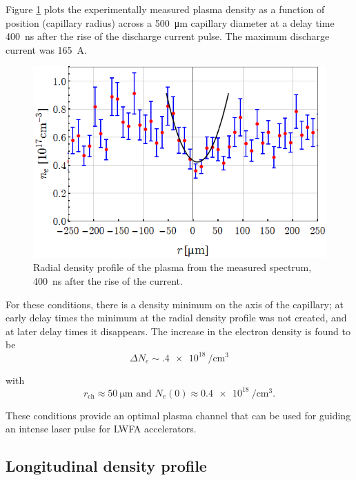 \documentclass[../main.tex]{subfiles}
\begin{document}
Figure \ref{fig:plasma_channel_spectro} plots the experimentally measured plasma density as a function of position (capillary radius) across a \SI{500}{\um} capillary diameter at a delay time \SI{400}{\ns} after the rise of the discharge current pulse. The maximum discharge current was \SI{165}{\A}.

\begin{figure}
\centering
\includegraphics[width=\textwidth]{figures/spectro/parabolic.png}
\caption{Radial density profile of the plasma from the measured spectrum, \SI{400}{\ns} after the rise of the current.}
\label{fig:plasma_channel_spectro}
\end{figure}

For these conditions, there is a density minimum on the axis of the capillary; at early delay times the minimum at the radial density profile was not created, and at later delay times it disappears. The increase in the electron density is found to be 
\begin{equation}
    \Delta N_e \sim \SI{.4e18}{\per\cubic\cm}
\end{equation}

with
\begin{equation}
r_\text{ch}\approx \SI{50}{\um} \text{ and } N_e\left(0\right)\approx \SI{0.4e18}{\per\cubic\cm}.
\end{equation}

These conditions provide an optimal plasma channel that can be used for guiding an intense laser pulse for LWFA accelerators.

\subsection{Longitudinal density profile}\label{ssec:longi}
\end{document}
